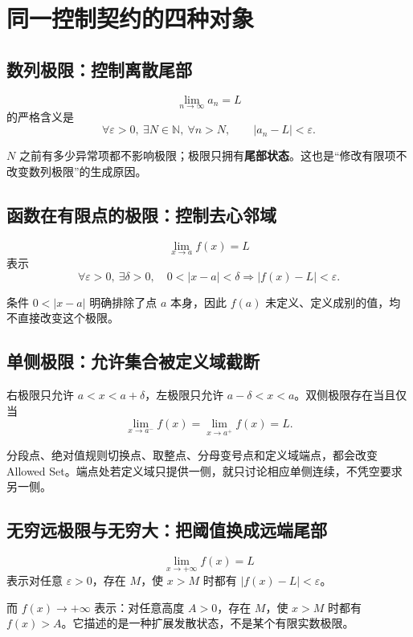 \documentclass[11pt,a4paper]{ctexart}
\newcommand{\kw}[1]{\textbf{\color{deep}#1}}
\begin{document}
\section{同一控制契约的四种对象}

\subsection{数列极限：控制离散尾部}

\[
\lim_{n\to\infty}a_n=L
\]
的严格含义是
\[
\forall\varepsilon>0,\ \exists N\in\mathbb N,\ \forall n>N,
\qquad |a_n-L|<\varepsilon.
\]

$N$ 之前有多少异常项都不影响极限；极限只拥有\kw{尾部状态}。这也是“修改有限项不改变数列极限”的生成原因。

\subsection{函数在有限点的极限：控制去心邻域}

\[
\lim_{x\to a}f(x)=L
\]
表示
\[
\forall\varepsilon>0,\ \exists\delta>0,\quad
0<|x-a|<\delta\Longrightarrow |f(x)-L|<\varepsilon.
\]

条件 $0<|x-a|$ 明确排除了点 $a$ 本身，因此 $f(a)$ 未定义、定义成别的值，均不直接改变这个极限。

\subsection{单侧极限：允许集合被定义域截断}

右极限只允许 $a<x<a+\delta$，左极限只允许 $a-\delta<x<a$。双侧极限存在当且仅当
\[
\lim_{x\to a^-}f(x)=\lim_{x\to a^+}f(x)=L.
\]

分段点、绝对值规则切换点、取整点、分母变号点和定义域端点，都会改变 Allowed Set。端点处若定义域只提供一侧，就只讨论相应单侧连续，不凭空要求另一侧。

\subsection{无穷远极限与无穷大：把阈值换成远端尾部}

\[
\lim_{x\to+\infty}f(x)=L
\]
表示对任意 $\varepsilon>0$，存在 $M$，使 $x>M$ 时都有 $|f(x)-L|<\varepsilon$。

而 $f(x)\to+\infty$ 表示：对任意高度 $A>0$，存在 $M$，使 $x>M$ 时都有 $f(x)>A$。它描述的是一种扩展发散状态，不是某个有限实数极限。
\end{document}

